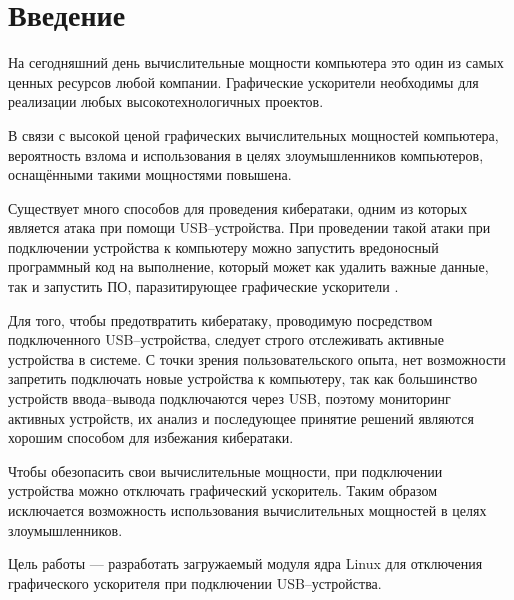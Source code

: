 \chapter*{Введение}

На сегодняшний день вычислительные мощности компьютера это один из самых ценных ресурсов любой компании. Графические ускорители необходимы для реализации любых высокотехнологичных проектов.

В связи с высокой ценой графических вычислительных мощностей компьютера, вероятность взлома и использования в целях злоумышленников компьютеров, оснащёнными такими мощностями повышена. 

Существует много способов для проведения кибератаки, одним из которых является атака при помощи USB--устройства. При проведении такой атаки при подключении устройства к компьютеру можно запустить вредоносный программный код на выполнение, который может как удалить важные данные, так и запустить ПО, паразитирующее графические ускорители \cite{usbmalware}.

Для того, чтобы предотвратить кибератаку, проводимую посредством подключенного USB--устройства, следует строго отслеживать активные устройства в системе. С точки зрения пользовательского опыта, нет возможности запретить подключать новые устройства к компьютеру, так как большинство устройств ввода--вывода подключаются через USB, поэтому мониторинг активных устройств, их анализ и последующее принятие решений являются хорошим способом для избежания кибератаки.

Чтобы обезопасить свои вычислительные мощности, при подключении устройства можно отключать графический ускоритель. Таким образом исключается возможность использования вычислительных мощностей в целях злоумышленников.

Цель работы --- разработать загружаемый модуля ядра Linux для отключения графического ускорителя при подключении USB--устройства.